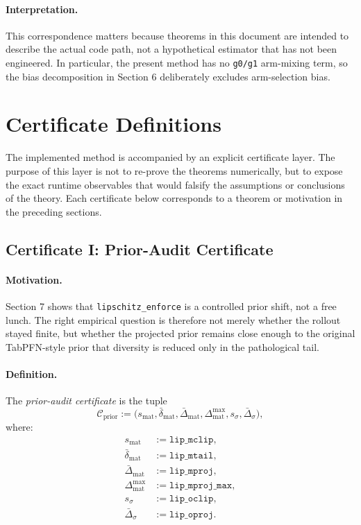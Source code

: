 \documentclass[11pt]{article}
\newcommand{\1}{\mathbf{1}}
\begin{document}
\paragraph{Interpretation.}
This correspondence matters because theorems in this document are intended to describe the actual code path, not a hypothetical estimator that has not been engineered. In particular, the present method has no \texttt{g0/g1} arm-mixing term, so the bias decomposition in Section 6 deliberately excludes arm-selection bias.

\section{Certificate Definitions}
The implemented method is accompanied by an explicit certificate layer. The purpose of this layer is not to re-prove the theorems numerically, but to expose the exact runtime observables that would falsify the assumptions or conclusions of the theory. Each certificate below corresponds to a theorem or motivation in the preceding sections.

\subsection{Certificate I: Prior-Audit Certificate}
\paragraph{Motivation.}
Section 7 shows that \texttt{lipschitz\_enforce} is a controlled prior shift, not a free lunch. The right empirical question is therefore not merely whether the rollout stayed finite, but whether the projected prior remains close enough to the original TabPFN-style prior that diversity is reduced only in the pathological tail.

\paragraph{Definition.}
The \emph{prior-audit certificate} is the tuple
\begin{equation}
  \mathcal{C}_{\mathrm{prior}}
  :=
  \big(
    s_{\mathrm{mat}},
    \bar{\delta}_{\mathrm{mat}},
    \bar{\Delta}_{\mathrm{mat}},
    \Delta^{\max}_{\mathrm{mat}},
    s_{\sigma},
    \bar{\Delta}_{\sigma}
  \big),
\end{equation}
where:
\begin{align}
  s_{\mathrm{mat}} &:= \texttt{lip\_mclip},\\
  \bar{\delta}_{\mathrm{mat}} &:= \texttt{lip\_mtail},\\
  \bar{\Delta}_{\mathrm{mat}} &:= \texttt{lip\_mproj},\\
  \Delta^{\max}_{\mathrm{mat}} &:= \texttt{lip\_mproj\_max},\\
  s_{\sigma} &:= \texttt{lip\_oclip},\\
  \bar{\Delta}_{\sigma} &:= \texttt{lip\_oproj}.
\end{align}
\end{document}
